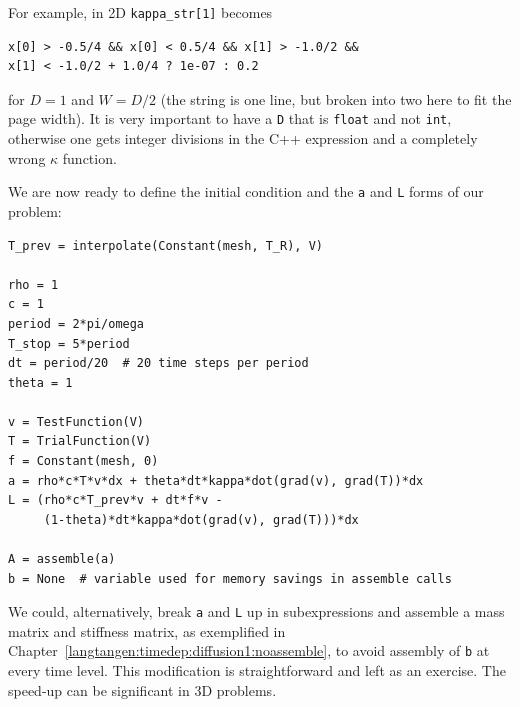 \noindent
For example, in 2D {\fontsize{12pt}{12pt}\verb!kappa_str[1]!} becomes
\begin{Verbatim}[fontsize=\fontsize{10pt}{10pt},tabsize=8,baselinestretch=1.05,
fontfamily=tt,xleftmargin=7mm]
x[0] > -0.5/4 && x[0] < 0.5/4 && x[1] > -1.0/2 &&
x[1] < -1.0/2 + 1.0/4 ? 1e-07 : 0.2
\end{Verbatim}
\noindent
for $D=1$ and $W=D/2$ (the string is one line, but
broken into two here to fit the page width). It is very important to have
a {\fontsize{12pt}{12pt}\texttt{D}} that is {\fontsize{12pt}{12pt}\texttt{float}} and not {\fontsize{12pt}{12pt}\texttt{int}}, otherwise one gets
integer divisions in the C++ expression and a completely wrong $\kappa$
function.

We are now ready to define the initial condition and the
{\fontsize{12pt}{12pt}\texttt{a}} and {\fontsize{12pt}{12pt}\texttt{L}} forms of our problem:
\begin{Verbatim}[fontsize=\fontsize{10pt}{10pt},tabsize=8,baselinestretch=1.05,
fontfamily=tt,xleftmargin=7mm]
T_prev = interpolate(Constant(mesh, T_R), V)

rho = 1
c = 1
period = 2*pi/omega
T_stop = 5*period
dt = period/20  # 20 time steps per period
theta = 1

v = TestFunction(V)
T = TrialFunction(V)
f = Constant(mesh, 0)
a = rho*c*T*v*dx + theta*dt*kappa*dot(grad(v), grad(T))*dx
L = (rho*c*T_prev*v + dt*f*v -
     (1-theta)*dt*kappa*dot(grad(v), grad(T)))*dx

A = assemble(a)
b = None  # variable used for memory savings in assemble calls
\end{Verbatim}
\noindent
We could, alternatively, break {\fontsize{12pt}{12pt}\texttt{a}} and {\fontsize{12pt}{12pt}\texttt{L}} up in subexpressions
and assemble a mass matrix and stiffness matrix, as exemplified in
Chapter~\ref{langtangen:timedep:diffusion1:noassemble}, to avoid
assembly of {\fontsize{12pt}{12pt}\texttt{b}} at every time level. This modification is
straightforward and left as an exercise. The speed-up can be significant
in 3D problems.

